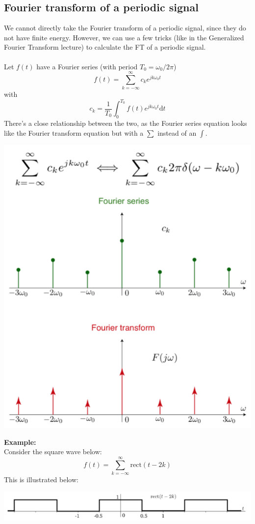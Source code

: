 \documentclass[10pt]{article}
\newcommand{\example}{\textbf{Example: }}
\newcommand{\rect}{\text{rect}}
\newcommand{\dd}{\text{d}}
\begin{document}
\subsection*{Fourier transform of a periodic signal}
We cannot directly take the Fourier transform of a periodic signal, since they do not have finite energy.  However, we can use a few tricks (like in the Generalized Fourier Transform lecture) to calculate the FT of a periodic signal.\\\\
Let $f(t)$ have a Fourier series (with period $T_0 = \omega_0/2\pi$)
\[f(t) = \sum_{k = -\infty}^\infty c_k e^{jk\omega_0 t}\]
with 
\[c_k = \frac{1}{T_0} \int_{0}^{T_0} f(t) e^{jk\omega_0 t} \dd t\]
There's a close relationship between the two, as the Fourier series equation looks like the Fourier transform equation but with a $\sum$ instead of an $\int$.
\begin{center}
    \includegraphics[scale=0.6]{W8_5.png}
\end{center}
\example\\
Consider the square wave below:
\[f(t) = \sum_{k=-\infty}^\infty \rect(t - 2k)\]
This is illustrated below:
\begin{center}
    \includegraphics[width=\textwidth]{W8_6.png}
\end{center}
\end{document}
